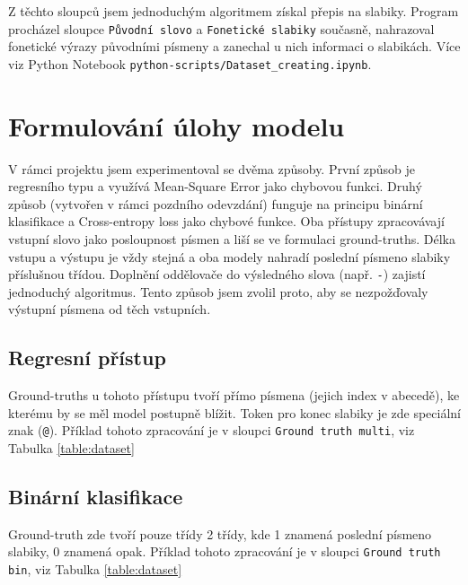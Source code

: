 \documentclass[a4paper]{article}
\theoremstyle{definition}
\begin{document}
Z těchto sloupců jsem jednoduchým algoritmem získal přepis na slabiky. Program procházel sloupce \texttt{Původní slovo} a \texttt{Fonetické slabiky} současně, nahrazoval fonetické výrazy původními písmeny a zanechal u nich informaci o slabikách. Více viz Python Notebook \texttt{python-scripts/Dataset\_creating.ipynb}.

\section{Formulování úlohy modelu}

V rámci projektu jsem experimentoval se dvěma způsoby. První způsob je regresního typu a využívá Mean-Square Error jako chybovou funkci. Druhý způsob (vytvořen v rámci pozdního odevzdání) funguje na principu binární klasifikace a Cross-entropy loss jako chybové funkce.
Oba přístupy zpracovávají vstupní slovo jako posloupnost písmen a liší se ve formulaci ground-truths. Délka vstupu a výstupu je vždy stejná a oba modely nahradí poslední písmeno slabiky příslušnou třídou. Doplnění oddělovače do výsledného slova (např. \texttt{-}) zajistí jednoduchý algoritmus. Tento způsob jsem zvolil proto, aby se nezpožďovaly výstupní písmena od těch vstupních. 

\subsection{Regresní přístup}

Ground-truths u tohoto přístupu tvoří přímo písmena (jejich index v abecedě), ke kterému by se měl model postupně blížit. Token pro konec slabiky je zde speciální znak (\texttt{@}). 
Příklad tohoto zpracování je v sloupci \texttt{Ground truth multi}, viz Tabulka \ref{table:dataset}

\subsection{Binární klasifikace}

Ground-truth zde tvoří pouze třídy 2 třídy, kde 1 znamená poslední písmeno slabiky, 0 znamená opak.
Příklad tohoto zpracování je v sloupci \texttt{Ground truth bin}, viz Tabulka \ref{table:dataset}
\end{document}
